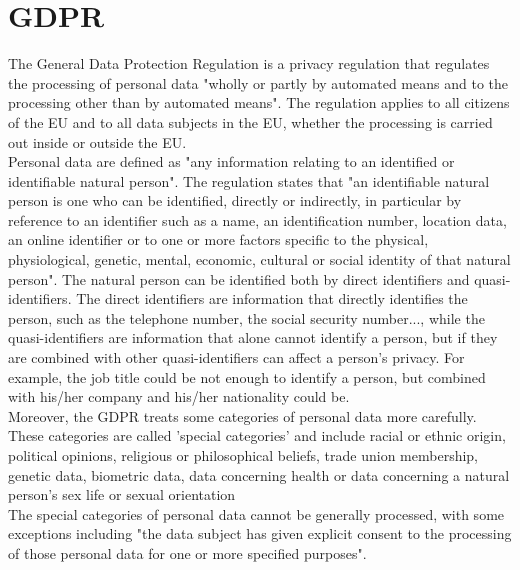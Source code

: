 \section{GDPR}
The General Data Protection Regulation is a privacy regulation that regulates the processing of personal data "wholly or partly by automated means and to the processing other than by automated means". The regulation applies to all citizens of the EU and to all data subjects in the EU, whether the processing is carried out inside or outside the EU. \\
Personal data are defined as "any information relating to an identified or identifiable natural person". The regulation states that "an identifiable natural person is one who can be identified, directly or indirectly, in particular by reference to an identifier such as a name, an identification number, location data, an online identifier or to one or more factors specific to the physical, physiological, genetic, mental, economic, cultural or social identity of that natural person". The natural person can be identified both by direct identifiers and quasi-identifiers. The direct identifiers are information that directly identifies the person, such as the telephone number, the social security number..., while the quasi-identifiers are information that alone cannot identify a person, but if they are combined with other quasi-identifiers can affect a person's privacy. For example, the job title could be not enough to identify a person, but combined with his/her company and his/her nationality could be. \\
Moreover, the GDPR treats some categories of personal data more carefully. These categories are called 'special categories' and include racial or ethnic origin, political opinions, religious or philosophical beliefs, trade union membership, genetic data, biometric data, data concerning health or data concerning a natural person's sex life or sexual orientation \\
The special categories of personal data cannot be generally processed, with some exceptions including "the data subject has given explicit consent to the processing of those personal data for one or more specified purposes".\\


